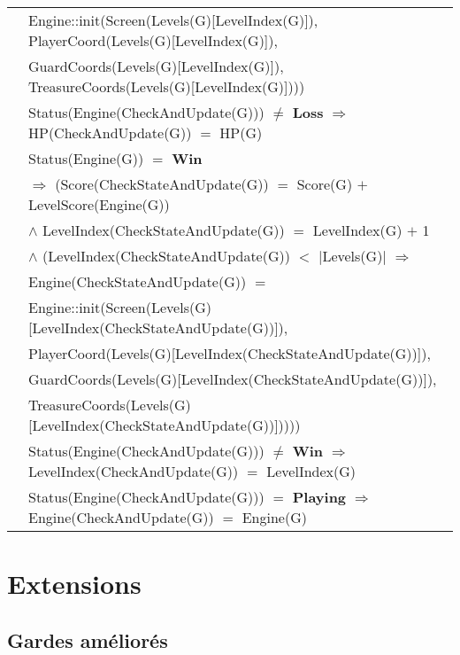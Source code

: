 \documentclass[8pt]{article}
\begin{document}
{\begin{longtable}{rl}
  & \quad\quad\quad\quad\quad\quad  \textrm{Engine::init(Screen(Levels(G)[LevelIndex(G)]), PlayerCoord(Levels(G)[LevelIndex(G)]),}\\
  & \quad\quad\quad\quad\quad\quad  \textrm{GuardCoords(Levels(G)[LevelIndex(G)]), TreasureCoords(Levels(G)[LevelIndex(G)]))})\\
  & \textrm{Status(Engine(CheckAndUpdate(G)))} $\neq$ \textbf{Loss} $\Rightarrow$ \textrm{HP(CheckAndUpdate(G))} $=$ \textrm{HP(G)}\\
  & \textrm{Status(Engine(G))} $=$ \textbf{Win}\\
  & \quad\quad $\Rightarrow$ (\textrm{Score(CheckStateAndUpdate(G))} $=$ \textrm{Score(G)} $+$ \textrm{LevelScore(Engine(G))}\\
  & \quad\quad\quad\quad $\land$ \textrm{LevelIndex(CheckStateAndUpdate(G))} $=$ \textrm{LevelIndex(G)} $+$ 1\\
  & \quad\quad\quad\quad $\land$ (\textrm{LevelIndex(CheckStateAndUpdate(G))} $<$ \textrm{$|$Levels(G)$|$} $\Rightarrow$\\
  & \quad\quad\quad\quad\quad\quad \textrm{Engine(CheckStateAndUpdate(G))} $=$\\
  & \quad\quad\quad\quad\quad\quad  \textrm{Engine::init(Screen(Levels(G)[LevelIndex(CheckStateAndUpdate(G))]),}\\
  & \quad\quad\quad\quad\quad\quad\quad\quad \textrm{PlayerCoord(Levels(G)[LevelIndex(CheckStateAndUpdate(G))]),}\\
  & \quad\quad\quad\quad\quad\quad\quad\quad  \textrm{GuardCoords(Levels(G)[LevelIndex(CheckStateAndUpdate(G))]),}\\
  & \quad\quad\quad\quad\quad\quad\quad\quad  \textrm{TreasureCoords(Levels(G)[LevelIndex(CheckStateAndUpdate(G))]))}))\\
  & \textrm{Status(Engine(CheckAndUpdate(G)))} $\neq$ \textbf{Win} $\Rightarrow$ \textrm{LevelIndex(CheckAndUpdate(G))} $=$ \textrm{LevelIndex(G)}\\
  & \textrm{Status(Engine(CheckAndUpdate(G)))} $=$ \textbf{Playing} $\Rightarrow$ \textrm{Engine(CheckAndUpdate(G))} $=$ \textrm{Engine(G)}\\
\end{longtable}}

\section{Extensions}

\subsection{Gardes améliorés}
\end{document}
